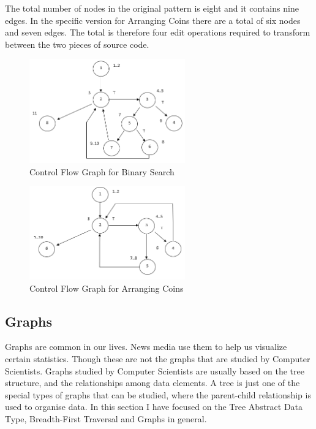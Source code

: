 \documentclass[10pt,twocolumn,hidelinks]{IEEEtran}
\begin{document}


\par The total number of nodes in the original pattern is eight and it contains nine edges. In the specific version for Arranging Coins there are a total of six nodes and seven edges. The total is therefore four edit operations required to transform between the two pieces of source code.
 \begin{figure}[h]
\includegraphics[width=0.6\textwidth]{CFGBinarySearch.png}
\caption{Control Flow Graph for Binary Search}
\label{fig:cfgbinarysearch}
\end{figure}
 \begin{figure}[h]
\includegraphics[width=0.6\textwidth]{CFGArrangingCoins.png}
\caption{Control Flow Graph for Arranging Coins}
\label{fig:cfgbinarysearch}
\end{figure}

	
	\subsection{Graphs}
	Graphs are common in our lives. News media use them to help us visualize certain statistics. Though these are not the graphs that are studied by Computer Scientists. Graphs studied by Computer Scientists are usually based on the tree structure, and the relationships 	among data elements. A tree is just one of the special types of graphs that can be studied, where the parent-child relationship is used to organise data. In this section I have focused on the Tree Abstract Data Type, Breadth-First Traversal and Graphs in general. \\
\end{document}
